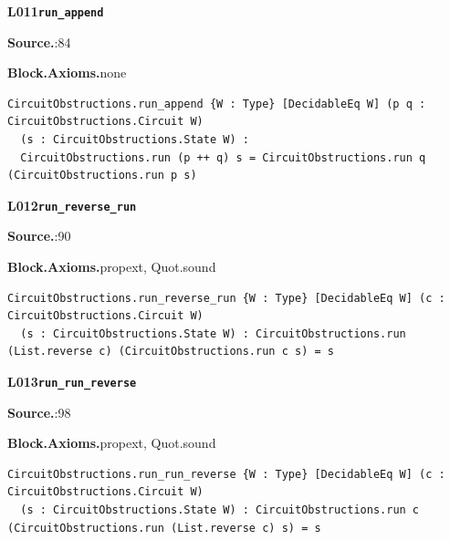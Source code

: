 \par\medskip\noindent\begin{minipage}{\textwidth}
{\small\bfseries L011\enspace\texttt{run\_append}\par}
{\footnotesize\raggedright\textbf{Source.}\enspace{}:84\par
\textbf{Block.}\quad\textbf{Axioms.}\enspace none\par}\nopagebreak
\begin{lstlisting}
CircuitObstructions.run_append {W : Type} [DecidableEq W] (p q : CircuitObstructions.Circuit W)
  (s : CircuitObstructions.State W) :
  CircuitObstructions.run (p ++ q) s = CircuitObstructions.run q (CircuitObstructions.run p s)
\end{lstlisting}
\end{minipage}\par

\par\medskip\noindent\begin{minipage}{\textwidth}
{\small\bfseries L012\enspace\texttt{run\_reverse\_run}\par}
{\footnotesize\raggedright\textbf{Source.}\enspace{}:90\par
\textbf{Block.}\quad\textbf{Axioms.}\enspace propext, Quot.sound\par}\nopagebreak
\begin{lstlisting}
CircuitObstructions.run_reverse_run {W : Type} [DecidableEq W] (c : CircuitObstructions.Circuit W)
  (s : CircuitObstructions.State W) : CircuitObstructions.run (List.reverse c) (CircuitObstructions.run c s) = s
\end{lstlisting}
\end{minipage}\par

\par\medskip\noindent\begin{minipage}{\textwidth}
{\small\bfseries L013\enspace\texttt{run\_run\_reverse}\par}
{\footnotesize\raggedright\textbf{Source.}\enspace{}:98\par
\textbf{Block.}\quad\textbf{Axioms.}\enspace propext, Quot.sound\par}\nopagebreak
\begin{lstlisting}
CircuitObstructions.run_run_reverse {W : Type} [DecidableEq W] (c : CircuitObstructions.Circuit W)
  (s : CircuitObstructions.State W) : CircuitObstructions.run c (CircuitObstructions.run (List.reverse c) s) = s
\end{lstlisting}
\end{minipage}\par

